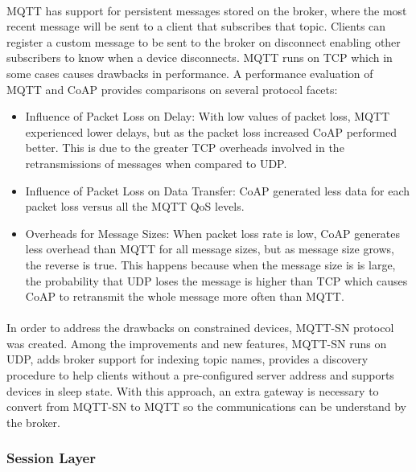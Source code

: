 \paragraph{}
\ac{MQTT} has support for persistent messages stored on the broker, where the most recent message will be sent to a client that subscribes that topic. Clients can register a custom message to be sent to the broker on disconnect enabling other subscribers to know when a device disconnects. \ac{MQTT} runs on \ac{TCP} which in some cases causes drawbacks in performance. A performance evaluation of \ac{MQTT} and \ac{CoAP} \cite{Ma2014} provides comparisons on several protocol facets:

\begin{itemize}
	\item Influence of Packet Loss on Delay: With low values of packet loss, \ac{MQTT} experienced lower delays, but as the packet loss increased \ac{CoAP} performed better. This is due to the greater \ac{TCP} overheads involved in the retransmissions of messages when compared to \ac{UDP}.\\
	\item Influence of Packet Loss on Data Transfer: \ac{CoAP} generated less data for each packet loss versus all the \ac{MQTT} \ac{QoS} levels.\\
	\item Overheads for Message Sizes: When packet loss rate is low, \ac{CoAP} generates less overhead than \ac{MQTT} for all message sizes, but as message size grows, the reverse is true. This happens because when the message size is is large, the probability that \ac{UDP} loses the message is higher than \ac{TCP} which causes \ac{CoAP} to retransmit the whole message more often than \ac{MQTT}.
\end{itemize}

\paragraph{}
	In order to address the drawbacks on constrained devices, \ac{MQTT-SN} protocol\cite{Ibm2013} was created. Among the improvements and new features, \ac{MQTT-SN} runs on UDP, adds broker support for indexing topic names, provides a discovery procedure to help clients without a pre-configured server address and supports devices in sleep state. With this approach, an extra gateway is necessary to convert from \ac{MQTT-SN} to \ac{MQTT} so the communications can be understand by the broker.

\subsubsection{Session Layer}

